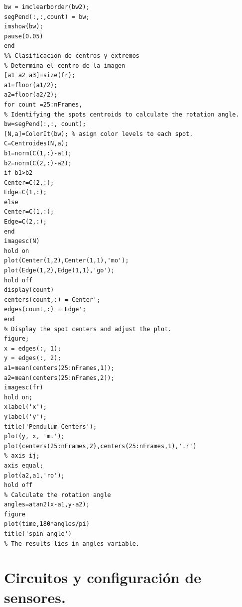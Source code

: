 \documentclass[10pt]{report}
\numberwithin{equation}{chapter}
\numberwithin{algorithm}{chapter}
\begin{document}
\begin{lstlisting}
bw = imclearborder(bw2);
segPend(:,:,count) = bw;
imshow(bw);
pause(0.05)
end
%% Clasificacion de centros y extremos
% Determina el centro de la imagen
[a1 a2 a3]=size(fr);
a1=floor(a1/2);
a2=floor(a2/2);
for count =25:nFrames,
% Identifying the spots centroids to calculate the rotation angle.
bw=segPend(:,:, count);
[N,a]=ColorIt(bw); % asign color levels to each spot.
C=Centroides(N,a);
b1=norm(C(1,:)-a1);
b2=norm(C(2,:)-a2);
if b1>b2
Center=C(2,:);
Edge=C(1,:);
else
Center=C(1,:);
Edge=C(2,:);
end
imagesc(N)
hold on
plot(Center(1,2),Center(1,1),'mo');
plot(Edge(1,2),Edge(1,1),'go');
hold off
display(count)
centers(count,:) = Center'; 
edges(count,:) = Edge';
end
% Display the spot centers and adjust the plot.
figure;
x = edges(:, 1);
y = edges(:, 2);
a1=mean(centers(25:nFrames,1));
a2=mean(centers(25:nFrames,2));
imagesc(fr)
hold on;
xlabel('x');
ylabel('y');
title('Pendulum Centers');
plot(y, x, 'm.');
plot(centers(25:nFrames,2),centers(25:nFrames,1),'.r')
% axis ij;
axis equal;
plot(a2,a1,'ro');
hold off
% Calculate the rotation angle
angles=atan2(x-a1,y-a2);
figure
plot(time,180*angles/pi)
title('spin angle')
% The results lies in angles variable.
\end{lstlisting}
\chapter{Circuitos y configuración de sensores.}\label{apen4}
\newpage
\end{document}

